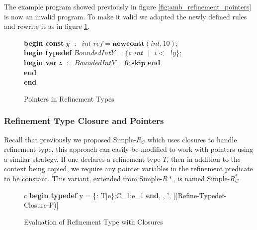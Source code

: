 \documentclass[a4paper,12pt]{report}
\newenvironment{tabs}[1]
 {\flushleft\TabPositions{#1}}
 {\endflushleft}
\begin{document}
\par
The example program showed previously in figure \ref{fig:amb_refinement_pointers} 
is now an invalid program. To make it valid we adapted the newly defined rules 
and rewrite it as in figure \ref{fig:valid_ptr_program}.

\begin{figure} [H]
  \begin{tabs}{1cm,2cm}
    \textbf{begin const }$y\text{ }:\text{ } int\textit{ ref} = \textbf{newconst}(int, 10);$\\
    \tab\textbf{begin typedef }$BoundedIntY$ = $\{i : int\text{ }|\text{ }i <\text{ }!y\}$; \\ 
    \tab\tab\textbf{begin var }$z\text{ }:\text{ }BoundedIntY = 6;\textbf{skip}$\textbf { end} \\
    \tab\textbf {end} \\
    \textbf{end}
  \end{tabs}  
  \caption{Pointers in Refinement Types}
  \label{fig:valid_ptr_program}
\end{figure}


\subsubsection{Refinement Type Closure and Pointers}
Recall that previously we proposed Simple-$R_{C}$ which uses closures to handle 
refinement type, this approach can easily be modified to work with pointers using a 
similar strategy. If one declares a refinement type $T$, then in addition to 
the context being copied, we require any pointer variables in the refinement 
predicate to be constant. This variant, extended from Simple-$R{*}$, is 
named Simple-$R^{*}_{C}$

\begin{figure}[H]
  \begin{center}
    \begin{tabular} {c}      
      {\langle\textbf{begin typedef } y = \{\upsilon : T\text{ }|\text{ }e\};C_1;e_1\textbf{ end}, 
      \sigma, \tau \rangle \longrightarrow \langle \sigma', \tau \rangle} [(Refine-Typedef-Closure-P)]
    \end{tabular}
  \end{center}
  \caption{Evaluation of Refinement Type with Closures}
\end{figure}
\end{document}
